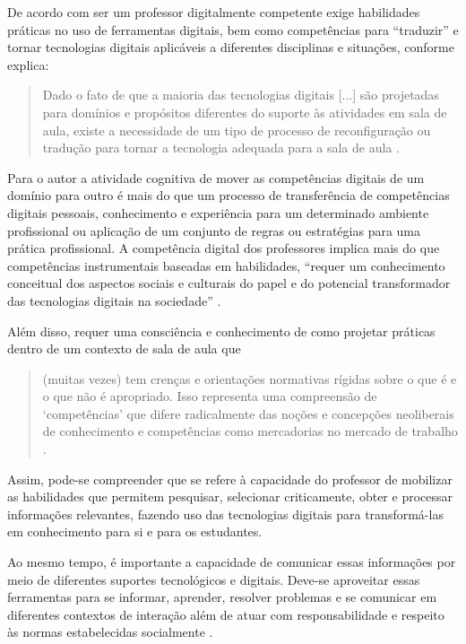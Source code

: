 \documentclass[portuguese]{textolivre}
\begin{document}
De acordo com \textcite{engen2019} ser um professor digitalmente competente
exige habilidades práticas no uso de ferramentas digitais, bem como
competências para ``traduzir'' e tornar tecnologias digitais aplicáveis
a diferentes disciplinas e situações, conforme explica:
\begin{quote}
Dado o fato de que a maioria das tecnologias digitais {[}...{]} são
projetadas para domínios e propósitos diferentes do suporte às
atividades em sala de aula, existe a necessidade de um tipo de processo
de reconfiguração ou tradução para tornar a tecnologia adequada para a
sala de aula \cite[p.~18, tradução nossa]{engen2019}.
\end{quote}

Para o autor a atividade cognitiva de mover as competências digitais de
um domínio para outro é mais do que um processo de transferência de
competências digitais pessoais, conhecimento e experiência para um
determinado ambiente profissional ou aplicação de um conjunto de regras
ou estratégias para uma prática profissional. A competência digital dos
professores implica mais do que competências instrumentais baseadas em
habilidades, ``requer um conhecimento conceitual dos aspectos sociais e
culturais do papel e do potencial transformador das tecnologias digitais
na sociedade'' \cite[p.~18]{engen2019}.

Além disso, requer uma consciência e conhecimento de como projetar
práticas dentro de um contexto de sala de aula que
\begin{quote}
(muitas vezes) tem crenças e orientações normativas rígidas sobre o que
é e o que não é apropriado. Isso representa uma compreensão de
`competências' que difere radicalmente
das noções e concepções neoliberais de conhecimento e competências como
mercadorias no mercado de trabalho \cite[p.~18, grifo do autor,
tradução nossa]{engen2019}.
\end{quote}

Assim, pode-se compreender que se refere à capacidade do professor de
mobilizar as habilidades que permitem pesquisar, selecionar
criticamente, obter e processar informações relevantes, fazendo uso das
tecnologias digitais para transformá-las em conhecimento para si e para
os estudantes.

Ao mesmo tempo, é importante a capacidade de comunicar essas informações
por meio de diferentes suportes tecnológicos e digitais. Deve-se
aproveitar essas ferramentas para se informar, aprender, resolver
problemas e se comunicar em diferentes contextos de interação além de
atuar com responsabilidade e respeito às normas estabelecidas
socialmente \cite{floreslueg2016}.
\end{document}
